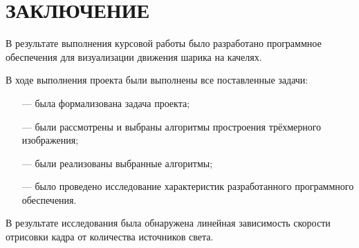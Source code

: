 \chapter*{ЗАКЛЮЧЕНИЕ}

В результате выполнения курсовой работы было разработано программное обеспечения для визуализации движения шарика на качелях.

В ходе выполнения проекта были выполнены все поставленные задачи:
\begin{itemize}
	\item[---] была формализована задача проекта;
	\item[---] были рассмотрены и выбраны алгоритмы простроения трёхмерного изображения;
	\item[---] были реализованы выбранные алгоритмы;
	\item[---] было проведено исследование характеристик разработанного программного обеспечения.
\end{itemize}

В результате исследования была обнаружена линейная зависимость скорости отрисовки кадра от количества источников света.

\pagebreak